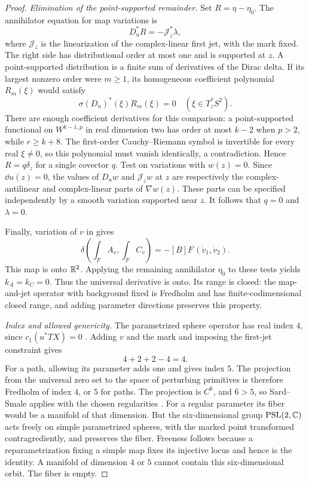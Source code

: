 \begin{proof}
\emph{Elimination of the point-supported remainder.}
Set $R=\eta-\eta_0$.  The annihilator equation for map variations is
\begin{equation}\label{eq:pencil-point-distribution}
 D_u^*R=-\mathcal J_z^*\lambda,
\end{equation}
where $\mathcal J_z$ is the linearization of the complex-linear first
jet, with the mark fixed.  The right side has distributional order at
most one and is supported at $z$.  A point-supported distribution is
a finite sum of derivatives of the Dirac delta.  If its largest
nonzero order were $m\geq1$, its homogeneous coefficient polynomial
$R_m(\xi)$ would satisfy
\[
 \sigma(D_u)^*(\xi)R_m(\xi)=0
 \quad(\xi\in T_z^*S^2).
\]
There are enough coefficient derivatives for this comparison: a
point-supported functional on $W^{k-1,p}$ in real dimension two has
order at most $k-2$ when $p>2$, while $r\geq k+8$.
The first-order Cauchy--Riemann symbol is invertible for every real
$\xi\ne0$, so this polynomial must vanish identically, a
contradiction.  Hence $R=q\delta_z$ for a single covector $q$.
Test  on variations with $w(z)=0$.
Since $\dd u(z)=0$, the values of $D_uw$ and $\mathcal J_zw$ at
$z$ are respectively the complex-antilinear and complex-linear parts
of $\nabla w(z)$.  These parts can be specified independently by a
smooth variation supported near $z$.  It follows that $q=0$ and
$\lambda=0$.

Finally, variation of $v$ in  gives
\begin{equation}\label{eq:pencil-period-cokernel}
 \delta\left(\int_F A_v,\int_F C_v\right)
 =-[B]F\,(\dot v_1,\dot v_2).
\end{equation}
This map is onto $\mathbb R^2$.  Applying the remaining annihilator
$\eta_0$ to these tests yields $k_A=k_C=0$.  Thus the universal
derivative is onto.  Its range is closed: the map-and-jet operator
with background fixed is Fredholm and has finite-codimensional
closed range, and adding parameter directions preserves this
property.

\emph{Index and allowed genericity.}
The parametrized sphere operator has real index $4$, since
$c_1(u^*TX)=0$ \cite[Theorem~3.22]{Wendl2014Lectures}.
Adding $v$ and the mark and imposing the first-jet
constraint gives
\begin{equation}\label{eq:pencil-critical-index}
 4+2+2-4=4.
\end{equation}
For a path, allowing its parameter adds one and gives index $5$.
The projection from the universal zero set to the space of perturbing
primitives is therefore Fredholm of index $4$, or $5$ for paths.
The projection is $C^6$, and $6>5$, so Sard--Smale applies with the
chosen regularities \cite[Theorem~1.3]{Smale1965}.  For a regular
parameter its fiber would be a manifold of that dimension.  But the
six-dimensional group $\operatorname{PSL}(2,\mathbb C)$ acts freely on
simple parametrized spheres, with the marked point transformed
contragrediently, and preserves the fiber.  Freeness follows because
a reparametrization fixing a simple map fixes its injective locus and
hence is the identity.  A manifold of dimension $4$ or $5$ cannot
contain this six-dimensional orbit.  The fiber is empty.


\end{proof}
